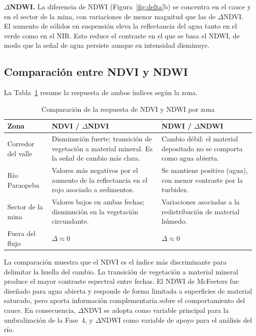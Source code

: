 \documentclass[12pt]{article}
\begin{document}
\textbf{$\Delta$NDWI.} La diferencia de NDWI (Figura~\ref{fig:delta}b) se concentra en el cauce y en el sector de la mina, con variaciones de menor magnitud que las de $\Delta$NDVI. El aumento de sólidos en suspensión eleva la reflectancia del agua tanto en el verde como en el NIR. Esto reduce el contraste en el que se basa el NDWI, de modo que la señal de agua persiste aunque su intensidad disminuye.

\subsection{Comparación entre NDVI y NDWI}
La Tabla~\ref{tab:comparacion} resume la respuesta de ambos índices según la zona.

\begin{table}[H]
 \centering
 \caption{Comparación de la respuesta de NDVI y NDWI por zona}
 \label{tab:comparacion}
 \begin{tabularx}{\textwidth}{lXX}
  \toprule
  \textbf{Zona} & \textbf{NDVI / $\Delta$NDVI} & \textbf{NDWI / $\Delta$NDWI} \\
  \midrule
  Corredor del valle & Disminución fuerte: transición de vegetación a material mineral. Es la señal de cambio más clara. & Cambio débil: el material depositado no se comporta como agua abierta. \\
  Río Paraopeba & Valores más negativos por el aumento de la reflectancia en el rojo asociado a sedimentos. & Se mantiene positivo (agua), con menor contraste por la turbidez. \\
  Sector de la mina & Valores bajos en ambas fechas; disminución en la vegetación circundante. & Variaciones asociadas a la redistribución de material húmedo. \\
  Fuera del flujo & $\Delta \approx 0$ & $\Delta \approx 0$ \\
  \bottomrule
 \end{tabularx}
\end{table}

La comparación muestra que el NDVI es el índice más discriminante para delimitar la huella del cambio. La transición de vegetación a material mineral produce el mayor contraste espectral entre fechas. El NDWI de McFeeters fue diseñado para agua abierta y responde de forma limitada a superficies de material saturado, pero aporta información complementaria sobre el comportamiento del cauce. En consecuencia, $\Delta$NDVI se adopta como variable principal para la umbralización de la Fase~4, y $\Delta$NDWI como variable de apoyo para el análisis del río.
\end{document}
